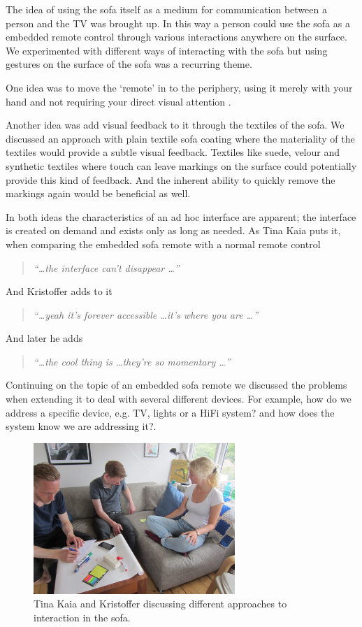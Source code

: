 
The idea of using the sofa itself as a medium for communication between a person and the TV was brought up.
In this way a person could use the sofa as a embedded remote control through various interactions anywhere on the surface.
We experimented with different ways of interacting with the sofa but using gestures on the surface of the sofa was a recurring theme.

One idea was to move the `remote' in to the periphery, using it merely with your hand and not requiring your direct visual attention .

Another idea was add visual feedback to it through the textiles of the sofa.
We discussed an approach with plain textile sofa coating where the materiality of the textiles would provide a subtle visual feedback.
Textiles like suede, velour and synthetic textiles where touch can leave markings on the surface could potentially provide this kind of feedback.
And the inherent ability to quickly remove the markings again would be beneficial as well.

In both ideas the characteristics of an ad hoc interface are apparent; the interface is created on demand and exists only as long as needed.
As Tina Kaia puts it, when comparing the embedded sofa remote with a normal remote control

\begin{quotation}
  \emph{``\dots the interface can't disappear \dots''}
\end{quotation}
And Kristoffer adds to it
\begin{quotation}
  \emph{``\dots yeah it's forever accessible \dots it's where you are \dots''}
\end{quotation}
And later he adds
\begin{quotation}
  \emph{``\dots the cool thing is \dots they're so momentary \dots''}
\end{quotation}

Continuing on the topic of an embedded sofa remote we discussed the problems when extending it to deal with several different devices.
For example, how do we address a specific device, e.g. TV, lights or a HiFi system? and how does the system know we are addressing it?.
\blank

\begin{figure}[h]
  \centering
      \includegraphics[width=3in]{figures/kaia_moos2}
  \caption{Tina Kaia and Kristoffer discussing different approaches to interaction in the sofa.}
   \label{kaia_moos2}
\end{figure}

